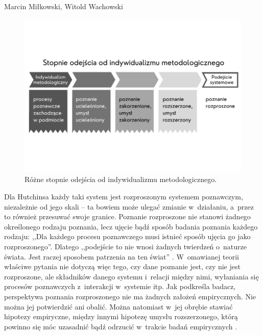 \begin{artplenv2auth}{Marcin Miłkowski, Witold Wachowski}
\begin{figure}
\begin{center}
 \includegraphics[width=1\textwidth]{ART_milkowski/ilustracja2pu.pdf}
\end{center}
 \caption{Różne stopnie odejścia od indywidualizmu metodologicznego.}\label{fig2milk}
\end{figure}



Dla Hutchinsa każdy taki system jest rozproszonym systemem poznawczym, niezależnie od jego skali -- ta bowiem może ulegać zmianie w~działaniu, a~przez to również przesuwać swoje granice. Poznanie rozproszone nie stanowi żadnego określonego rodzaju poznania, lecz ujęcie bądź sposób badania poznania każdego rodzaju: ,,Dla każdego procesu poznawczego musi istnieć sposób ujęcia go jako rozproszonego''. Dlatego ,,podejście to nie wnosi żadnych twierdzeń o~naturze świata. Jest raczej sposobem patrzenia na ten świat''
\parencite[][s.~36]{hutchins_cultural_2014}. %
 W~omawianej teorii właściwe pytania nie dotyczą więc tego, czy dane poznanie jest, czy nie jest rozproszone, ale składników danego systemu i~relacji między nimi, wyłaniania się procesów poznawczych z~interakcji w~systemie itp. Jak podkreśla badacz, perspektywa poznania rozproszonego nie ma żadnych założeń empirycznych. Nie można jej potwierdzić ani obalić. Można natomiast w~jej obrębie stawiać hipotezy empiryczne, między innymi hipotezę umysłu rozszerzonego, którą powinno się móc uzasadnić bądź odrzucić w~trakcie badań empirycznych 
\parencite[][s.~36–37]{hutchins_cultural_2014}.%



\end{artplenv2auth}
